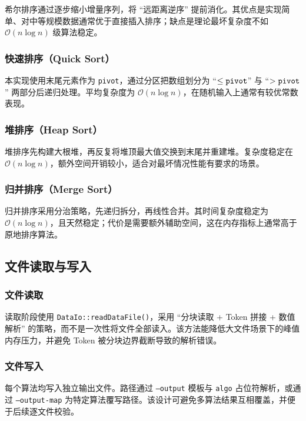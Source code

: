 \documentclass[12pt, a4paper]{ctexart}
\begin{document}
希尔排序通过逐步缩小增量序列，将 ``远距离逆序'' 提前消化。其优点是实现简单、对中等规模数据通常优于直接插入排序；缺点是理论最坏复杂度不如 $\mathcal{O}\left(n\log n\right)$ 级算法稳定。

\subsubsection{快速排序（Quick Sort）}

本实现使用末尾元素作为 \texttt{pivot}，通过分区把数组划分为 ``$\leq \text{\texttt{pivot}}$'' 与 ``$> \text{\texttt{pivot}}$'' 两部分后递归处理。平均复杂度为 $\mathcal{O}\left(n\log n\right)$，在随机输入上通常有较优常数表现。

\subsubsection{堆排序（Heap Sort）}

堆排序先构建大根堆，再反复将堆顶最大值交换到末尾并重建堆。复杂度稳定在 $\mathcal{O}\left(n\log n\right)$，额外空间开销较小，适合对最坏情况性能有要求的场景。

\subsubsection{归并排序（Merge Sort）}

归并排序采用分治策略，先递归拆分，再线性合并。其时间复杂度稳定为 $\mathcal{O}\left(n\log n\right)$，且天然稳定；代价是需要额外辅助空间，这在内存指标上通常高于原地排序算法。

\subsection{文件读取与写入}

\subsubsection{文件读取}

读取阶段使用 \texttt{DataIo::readDataFile()}，采用 ``分块读取 + Token 拼接 + 数值解析'' 的策略，而不是一次性将文件全部读入。该方法能降低大文件场景下的峰值内存压力，并避免 Token 被分块边界截断导致的解析错误。

\subsubsection{文件写入}

每个算法均写入独立输出文件。路径通过 \texttt{--output} 模板与 \texttt{{algo}} 占位符解析，或通过 \texttt{--output-map} 为特定算法覆写路径。该设计可避免多算法结果互相覆盖，并便于后续逐文件校验。
\end{document}
